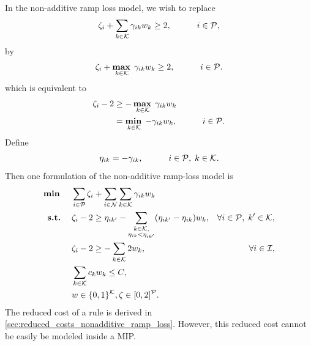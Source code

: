 In the non-additive ramp loss model, we wish to replace
\[
    \zeta_i + \sum_{k \in \mathcal{K}} \gamma_{ik} w_k \geq 2, \quad \quad \quad i \in \mathcal{P},
\]
by
\[
    \zeta_i + \mathop{\text{\textbf{max}}}\limits_{\,k \in \mathcal{K}} \; \gamma_{ik} w_k \geq 2, \quad \quad \quad i \in \mathcal{P}.
\]
which is equivalent to
\begin{equation*}
    \begin{split}
        \zeta_i - 2 &\geq - \mathop{\text{\textbf{max}}}\limits_{\,k \in \mathcal{K}} \; \gamma_{ik} w_k\\
        &= \mathop{\text{\textbf{min}}}\limits_{\,k \in \mathcal{K}} \; -\gamma_{ik} w_k , \quad \quad \quad i \in \mathcal{P}. \\
    \end{split}
\end{equation*}
Define
\[
    \eta_{ik} = -\gamma_{ik}, \quad \quad \quad i \in \mathcal{P}, \; k \in \mathcal{K}.
\]
Then one formulation of the non-additive ramp-loss model is
\begin{subequations}
    \label{eq:NRM}
    \begin{align}
        \mathbf{\text{\textbf{min }}} \quad & \sum_{i \in \mathcal{P}} \zeta_i + \sum_{i \in \mathcal{N}} \sum_{k \in \mathcal{K}} \gamma_{ik} w_k \label{eq:NRM-obj} \\
        \mathbf{\text{\textbf{s.t.}}\;} \quad & \zeta_i - 2 \geq \eta_{ik'} - \sum_{\substack{k \in \mathcal{K}, \\ \eta_{ik} < \eta_{ik'}}} (\eta_{ik'}-\eta_{ik}) w_k,
        & \forall i \in \mathcal{P}, \; k' \in \mathcal{K}, \label{eq:NRM-misP} \\
        & \zeta_i - 2 \geq - \sum_{k \in \mathcal{K}} 2w_k, & \forall i \in \mathcal{I}, \label{eq:NRM-fix}\\
        & \sum_{k \in \mathcal{K}} c_k w_k \leq C, & \label{eq:NRM-complex} \\
        & w \in \{0, 1\}^{\mathcal{K}}, \zeta \in [0,2]^{\mathcal{P}}. \label{eq:NRM-vars}
    \end{align}
\end{subequations}
The reduced cost of a rule is derived in \autoref{sec:reduced_costs_nonadditive_ramp_loss}.
However, this reduced cost cannot be easily be modeled inside a MIP\@.

